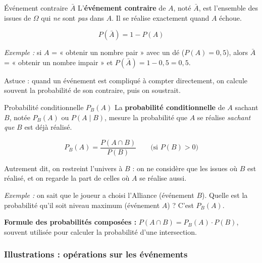 \documentclass[11pt,a4paper]{article}
\begin{document}
	\begin{ficheprobas}{Événement contraire $\bar{A}$}
		L'\textbf{événement contraire} de $A$, noté $\bar{A}$, est l'ensemble des
		issues de $\Omega$ qui \emph{ne} sont \emph{pas} dans $A$. Il se réalise
		exactement quand $A$ échoue.
		\begin{formule}
			\[ P\left(\bar{A}\right) = 1 - P\left(A\right) \]
		\end{formule}
		\emph{Exemple :} si $A$ = « obtenir un nombre pair » avec un dé
		($P\left(A\right) = 0{,}5$), alors $\bar{A}$ = « obtenir un nombre impair » et
		$P\left(\bar{A}\right) = 1 - 0{,}5 = 0{,}5$.
		
		Astuce : quand un événement est compliqué à compter directement, on calcule
		souvent la probabilité de son contraire, puis on soustrait.
	\end{ficheprobas}
	
	\begin{ficheprobas}{Probabilité conditionnelle $P_B\left(A\right)$}
		La \textbf{probabilité conditionnelle} de $A$ sachant $B$, notée
		$P_B\left(A\right)$ ou $P\left(A \mid B\right)$, mesure la probabilité que $A$
		se réalise \emph{sachant que} $B$ est déjà réalisé.
		\begin{formule}
			\[ P_B\left(A\right) = \dfrac{P\left(A \cap B\right)}{P\left(B\right)}
			\qquad \text{(si } P\left(B\right) > 0\text{)} \]
		\end{formule}
		Autrement dit, on restreint l'univers à $B$ : on ne considère que les issues où
		$B$ est réalisé, et on regarde la part de celles où $A$ se réalise aussi.
		
		\emph{Exemple :} on sait que le joueur a choisi l'Alliance (événement $B$).
		Quelle est la probabilité qu'il soit niveau maximum (événement $A$) ?
		C'est $P_B\left(A\right)$.
		
		\textbf{Formule des probabilités composées :}
		$P\left(A \cap B\right) = P_B\left(A\right) \cdot P\left(B\right)$, souvent
		utilisée pour calculer la probabilité d'une intersection.
	\end{ficheprobas}
	
	\subsubsection{Illustrations : opérations sur les événements}
	
\end{document}
